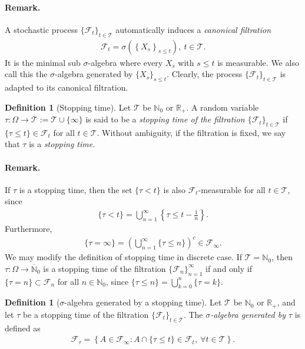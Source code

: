\documentclass{article}
\numberwithin{equation}{section}
\theoremstyle{plain}
\theoremstyle{definition}
\newtheorem{definition}[theorem]{Definition}
\begin{document}
\paragraph{Remark.} A stochastic process $\{\mathscr{F}_t\}_{t\in\mathcal{T}}$ automatically induces a \textit{canonical filtration}
\begin{align*}
	\mathscr{F}_t = \sigma(\left\{X_s\right\}_{s\leq t}),\ t\in\mathcal{T}.
\end{align*}
It is the minimal sub $\sigma$-algebra where every $X_s$ with $s\leq t$ is measurable. We also call this the $\sigma$-algebra generated by $\{X_s\}_{s\leq t}$. Clearly, the process $\{\mathscr{F}_t\}_{t\in\mathcal{T}}$ is adapted to its canonical filtration.

\begin{definition}[Stopping time]\label{def:3.4} Let $\mathcal{T}$ be $\mathbb{N}_0$ or $\mathbb{R}_+$. A random variable $\tau:\Omega\to\overline{\mathcal{T}}:=\mathcal{T}\cup\{\infty\}$ is said to be a \textit{stopping time of the filtration $\{\mathscr{F}_t\}_{t\in\mathcal{T}}$} if $\{\tau\leq t\}\in\mathscr{F}_t$ for all $t\in\mathcal{T}$. Without ambiguity, if the filtration is fixed, we say that $\tau$ is a \textit{stopping time}.
\end{definition}

\paragraph{Remark.} If $\tau$ is a stopping time, then the set $\{\tau<t\}$ is also $\mathscr{F}_t$-measurable for all $t\in\mathcal{T}$, since
\begin{align*}
	\{\tau<t\}=\bigcup_{n=1}^\infty\left\{\tau\leq t-\frac{1}{n}\right\}.
\end{align*}
Furthermore,
\begin{align*}
	\{\tau=\infty\}=\left(\bigcup_{n=1}^\infty\{\tau\leq n\}\right)^c\in\mathscr{F}_\infty.
\end{align*}
We may modify the definition of stopping time in discrete case. If $\mathcal{T}=\mathbb{N}_0$, then $\tau:\Omega\to\overline{\mathbb{N}}_0$ is a stopping time of  the filtration $\{\mathscr{F}_n\}_{n=1}^{\infty}$ if and only if $\{\tau=n\}\subset\mathscr{F}_n$ for all $n\in\mathbb{N}_0$, since $\{\tau\leq n\} = \bigcup_{k=0}^n\{\tau=k\}.$

\begin{definition}[$\sigma$-algebra generated by a stopping time]\label{def:3.5} Let $\mathcal{T}$ be $\mathbb{N}_0$ or $\mathbb{R}_+$, and let $\tau$ be a stopping time of the filtration  $\{\mathscr{F}_t\}_{t\in\mathcal{T}}$. The \textit{$\sigma$-algebra generated by $\tau$} is defined as
\begin{align*}
	\mathscr{F}_\tau = \left\{A\in\mathscr{F}_\infty: A\cap\{\tau\leq t\}\in\mathscr{F}_t,\ \forall t\in\mathcal{T}\right\}.
\end{align*}
\end{definition}
\end{document}
